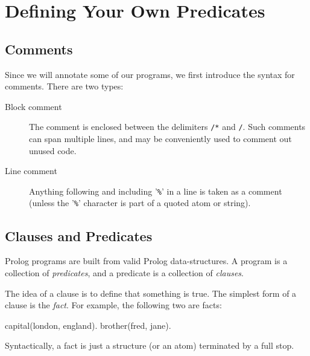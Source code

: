 \section{Defining Your Own Predicates}

\subsection{Comments}
       Since we will annotate some of our programs, we first introduce
       the syntax for comments. There are two types:
       \begin{description}
        \item[Block comment] The comment is enclosed between the delimiters {\tt /*} and {\tt */}.
         Such comments can span multiple lines, and may be conveniently used
         to comment out unused code.
       \item[Line comment] Anything following and including '{\tt \%}' in a line is taken as a
       comment (unless 
        the '{\tt \%}' character is part of a quoted atom or string).
       \end{description}

\subsection{Clauses and Predicates}
\label{syntax}

      
     Prolog programs are built from valid Prolog data-structures.
     A program is a collection of {\it predicates}, and a
     predicate is a collection of {\it clauses}.

     The idea of a clause is to define that something is true.
     The simplest form of a clause is the {\em fact}.
     For example, the following two are facts:
\begin{code}
capital(london, england).
brother(fred, jane).
\end{code}
     Syntactically, a fact is just a structure (or an atom)
     terminated by a full stop.

